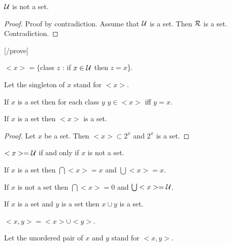 \documentclass[a4paper,draft]{amsproc}
\begin{document}
\begin{forthel}
\begin{theorem}[39]
$\cal{U}$ is not a set.
\end{theorem}
\begin{proof}
Proof by contradiction.
Assume that $\cal{U}$ is a set.
Then $\cal{R}$ is a set.
Contradiction.
\end{proof}
[/prove]

\begin{definition}[40]
$<x> = \{$class $z$ : if $x \in \cal{U}$ then $z = x$\}.
\end{definition}
Let the singleton of $x$ stand for $<x>$.


\begin{theorem}[41]
If $x$ is a set then for each class $y$ $y \in <x>$ iff $y = x$.
\end{theorem}

\begin{theorem}[42]
If $x$ is a set then $<x>$ is a set.
\end{theorem}
\begin{proof} Let $x$ be a set. Then $<x> \subset 2^{x}$ 
and $2^{x}$ is a set.
\end{proof}

\begin{theorem}[43]
$<x> = \cal{U}$ if and only if $x$ is not a set.
\end{theorem}

\begin{theorem}[44a]
If $x$ is a set then $\bigcap <x> = x$ 
and $\bigcup <x> = x$.
\end{theorem}

\begin{theorem}[44b]
If $x$ is not a set then $\bigcap <x> = 0$
and $\bigcup <x> = \cal{U}$.
\end{theorem}

\begin{axiom}[IV]
If $x$ is a set and $y$ is a set then $x \cup y$ is a set.
\end{axiom}

\begin{definition}[45] $<x,y> = <x> \cup <y>$.\end{definition}
Let the unordered pair of $x$ and $y$ stand for $<x,y>$.



\end{forthel}
\end{document}
